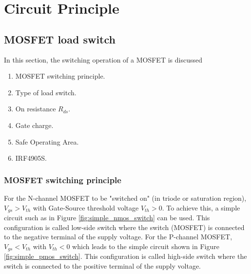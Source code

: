 \documentclass[main.tex]{subfiles}
\begin{document}
    \chapter{Circuit Principle}

    \section{MOSFET load switch}
    \justify
    In this section, the switching operation of a MOSFET is discussed
    \begin{enumerate}
        \item MOSFET switching principle.
        \item Type of load switch.
        \item On resistance $R_{ds}$.
        \item Gate charge.
        \item Safe Operating Area.
        \item IRF4905S.
    \end{enumerate}

    \pagebreak
    \subsection{MOSFET switching principle}

    \justify
    For the N-channel MOSFET to be  "switched on" (in triode or saturation region), $V_{gs} > V_{th}$ with Gate-Source threshold voltage $V_{th} > 0$. To achieve this, a simple circuit such as in Figure \ref{fig:simple_nmos_switch} can be used. This configuration is called low-side switch where  the switch (MOSFET) is connected to the negative terminal of the supply voltage. For the P-channel MOSFET, $V_{gs} < V_{th}$ with $V_{th} < 0$ which leads to the simple circuit shown in Figure \ref{fig:simple_pmos_switch}. This configuration is called high-side switch where  the switch is connected to the positive terminal of the supply voltage.
\end{document}
